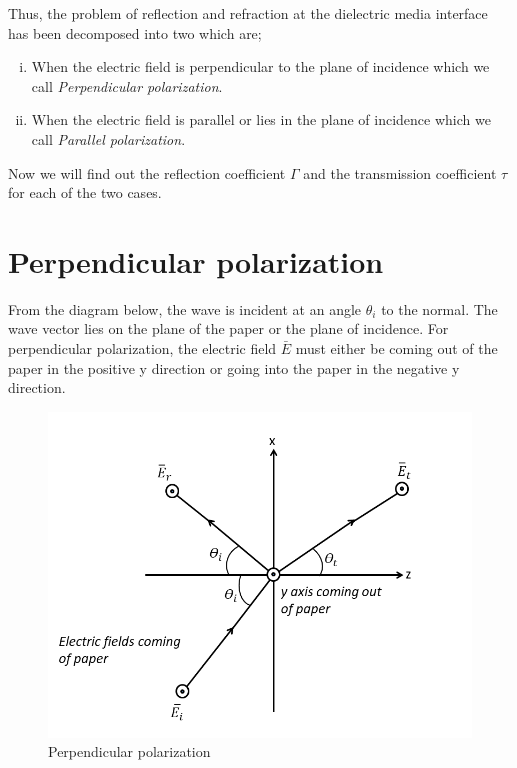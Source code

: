 Thus, the problem of reflection and refraction at the dielectric media interface has been decomposed into two which are;

\begin{enumerate}[(i)]
\item When the electric field is perpendicular to the plane of incidence which we call \emph{Perpendicular polarization}.
\item When the electric field is parallel or lies in the plane of incidence which we call \emph{Parallel polarization}.
\end{enumerate}

Now we will find out the reflection coefficient $\Gamma$ and the transmission coefficient $\tau$ for each of the two cases.

\section{Perpendicular polarization} 
From the diagram below, the wave is incident at an angle $\theta_{i}$ to the normal. The wave vector lies on the plane of the paper or the plane of incidence. For perpendicular polarization, the electric field $\bar{E}$ must either be coming out of the paper in the positive y direction or going into the paper in the negative y direction.
\begin{figure}[h]
\centering
\includegraphics[width=1\linewidth]{graphics/perpendicular_polarization1}
\caption{Perpendicular polarization}
\label{fig:12}
\end{figure}

